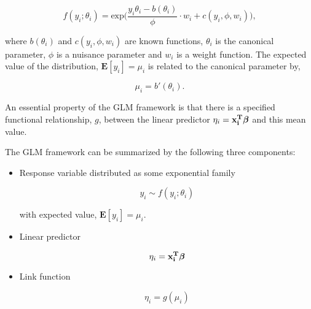 \begin{equation}
    f(y_i;\theta_i) = \text{exp}\Big(\frac{y_i \theta_i - b(\theta_i)}{\phi} \cdot w_i + c(y_i,\phi,w_i)\Big),
\end{equation}

where $b(\theta_i)$ and $c(y_i,\phi,w_i)$ are known functions, $\theta_i$ is the canonical parameter, $\phi$ is a nuisance parameter and $w_i$ is a weight function. The expected value of the distribution, $\mathbf{E}[y_i] = \mu_i$ is related to the canonical parameter by,

\begin{equation}
    \mu_i = b'(\theta_i).
\end{equation}

An essential property of the GLM framework is that there is a specified functional relationship, $g$, between the linear predictor $\eta_i = \bf x_i^T \bm{ \beta}$ and this mean value.

The GLM framework can be summarized by the following three components:

\begin{itemize}

\item Response variable distributed as some exponential family

\begin{equation}
    y_{i} \sim f(y_i;\theta_i)
\end{equation}

with expected value, $\mathbf{E}[y_i] = \mu_i$.

\item Linear predictor

\begin{equation}
    \eta_i = \bf x_i^T \bm{ \beta}
\end{equation}

\item Link function

\begin{equation}
    \eta_i = g(\mu_i)
\end{equation}

\end{itemize}





